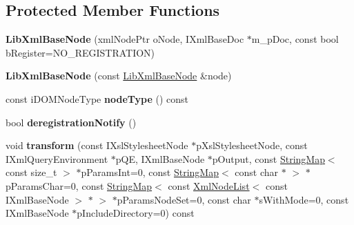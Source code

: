 \subsection*{\-Protected \-Member \-Functions}
\begin{DoxyCompactItemize}
\item 
\hypertarget{classgeneral__server_1_1LibXmlBaseNode_a441b8f151bd27bf5fb1319719e2de689}{{\bfseries \-Lib\-Xml\-Base\-Node} (xml\-Node\-Ptr o\-Node, \-I\-Xml\-Base\-Doc $\ast$m\-\_\-p\-Doc, const bool b\-Register=\-N\-O\-\_\-\-R\-E\-G\-I\-S\-T\-R\-A\-T\-I\-O\-N)}\label{classgeneral__server_1_1LibXmlBaseNode_a441b8f151bd27bf5fb1319719e2de689}

\item 
\hypertarget{classgeneral__server_1_1LibXmlBaseNode_a06a6f97e2f141adc5b592e5bfb2baae6}{{\bfseries \-Lib\-Xml\-Base\-Node} (const \hyperlink{classgeneral__server_1_1LibXmlBaseNode}{\-Lib\-Xml\-Base\-Node} \&node)}\label{classgeneral__server_1_1LibXmlBaseNode_a06a6f97e2f141adc5b592e5bfb2baae6}

\item 
\hypertarget{classgeneral__server_1_1LibXmlBaseNode_a866d82704d8851bc0232fa7748fa0c0c}{const i\-D\-O\-M\-Node\-Type {\bfseries node\-Type} () const }\label{classgeneral__server_1_1LibXmlBaseNode_a866d82704d8851bc0232fa7748fa0c0c}

\item 
\hypertarget{classgeneral__server_1_1LibXmlBaseNode_a97b6638a07a836707353b3584d3f498c}{bool {\bfseries deregistration\-Notify} ()}\label{classgeneral__server_1_1LibXmlBaseNode_a97b6638a07a836707353b3584d3f498c}

\item 
\hypertarget{classgeneral__server_1_1LibXmlBaseNode_ac245f8861bb0d5ffdb6ee4a45010b049}{void {\bfseries transform} (const \-I\-Xsl\-Stylesheet\-Node $\ast$p\-Xsl\-Stylesheet\-Node, const \-I\-Xml\-Query\-Environment $\ast$p\-Q\-E, \-I\-Xml\-Base\-Node $\ast$p\-Output, const \hyperlink{classgeneral__server_1_1StringMap}{\-String\-Map}$<$ const size\-\_\-t $>$ $\ast$p\-Params\-Int=0, const \hyperlink{classgeneral__server_1_1StringMap}{\-String\-Map}$<$ const char $\ast$ $>$ $\ast$p\-Params\-Char=0, const \hyperlink{classgeneral__server_1_1StringMap}{\-String\-Map}$<$ const \hyperlink{classgeneral__server_1_1XmlNodeList}{\-Xml\-Node\-List}$<$ const \-I\-Xml\-Base\-Node $>$ $\ast$ $>$ $\ast$p\-Params\-Node\-Set=0, const char $\ast$s\-With\-Mode=0, const \-I\-Xml\-Base\-Node $\ast$p\-Include\-Directory=0) const }\label{classgeneral__server_1_1LibXmlBaseNode_ac245f8861bb0d5ffdb6ee4a45010b049}


\end{DoxyCompactItemize}

